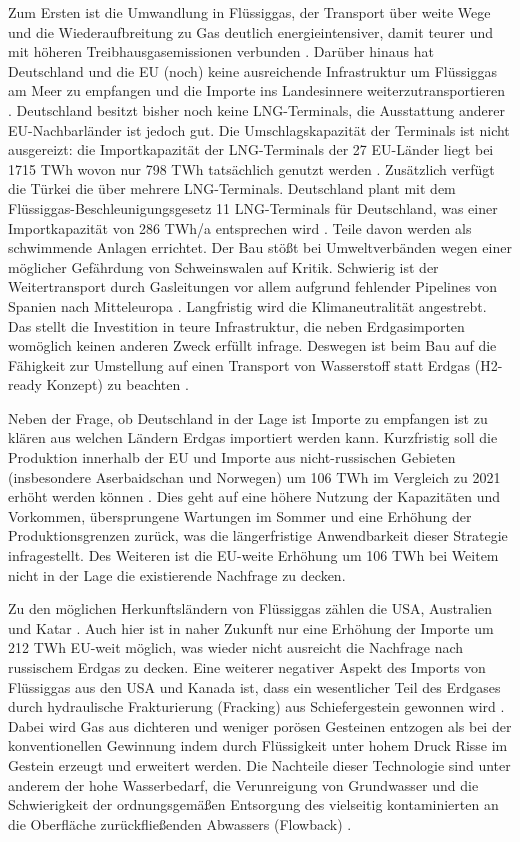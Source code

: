 Zum Ersten ist die Umwandlung in Flüssiggas, der Transport über weite Wege und die Wiederaufbreitung zu Gas deutlich energieintensiver, damit teurer und mit höheren Treibhausgasemissionen verbunden \cite{lng-faq}. 
Darüber hinaus hat Deutschland und die EU (noch) keine ausreichende Infrastruktur um Flüssiggas am Meer zu empfangen und die Importe ins Landesinnere weiterzutransportieren \cite{iwd}. Deutschland besitzt bisher noch keine LNG-Terminals, die Ausstattung anderer EU-Nachbarländer ist jedoch gut. 
Die Umschlagskapazität der Terminals ist nicht ausgereizt: die Importkapazität der LNG-Terminals der 27 EU-Länder liegt bei 1715 TWh wovon nur 798 TWh tatsächlich genutzt werden \cite{leo}. Zusätzlich verfügt die Türkei die über mehrere LNG-Terminals. 
Deutschland plant mit dem Flüssiggas-Beschleunigungsgesetz 11 LNG-Terminals für Deutschland, was einer Importkapazität von 286 TWh/a entsprechen wird \cite{lng-gesetz}. Teile davon werden als schwimmende Anlagen errichtet. Der Bau stößt bei Umweltverbänden wegen einer möglicher Gefährdung von Schweinswalen auf Kritik.
Schwierig ist der Weitertransport durch Gasleitungen vor allem aufgrund fehlender Pipelines von Spanien nach Mitteleuropa \cite{iwd}.
Langfristig wird die Klimaneutralität angestrebt. Das stellt die Investition in teure Infrastruktur, die neben Erdgasimporten womöglich keinen anderen Zweck erfüllt infrage. Deswegen ist beim Bau auf die Fähigkeit zur Umstellung auf einen Transport von Wasserstoff statt Erdgas (H2-ready Konzept) zu beachten \cite{leo}.

Neben der Frage, ob Deutschland in der Lage ist Importe zu empfangen ist zu klären aus welchen Ländern Erdgas importiert werden kann. Kurzfristig soll die Produktion innerhalb der EU und Importe aus nicht-russischen Gebieten (insbesondere Aserbaidschan und Norwegen) um 106 TWh im Vergleich zu 2021 erhöht werden können \cite{iea2022}. Dies geht auf eine höhere Nutzung der Kapazitäten und Vorkommen, übersprungene Wartungen im Sommer und eine Erhöhung der Produktionsgrenzen zurück, was die längerfristige Anwendbarkeit dieser Strategie infragestellt. Des Weiteren ist die EU-weite Erhöhung um 106 TWh bei Weitem nicht in der Lage die existierende Nachfrage zu decken.

Zu den möglichen Herkunftsländern von Flüssiggas zählen die USA, Australien und Katar \cite{iea2022}. Auch hier ist in naher Zukunft nur eine Erhöhung der Importe um 212 TWh EU-weit möglich, was wieder nicht ausreicht die Nachfrage nach russischem Erdgas zu decken. 
Eine weiterer negativer Aspekt des Imports von Flüssiggas aus den USA und Kanada ist, dass ein wesentlicher Teil des Erdgases durch hydraulische Frakturierung (Fracking) aus Schiefergestein gewonnen wird \cite{statista-schiefergasproduktion, statista-nicht-konventionelle-gase}. Dabei wird Gas aus dichteren und weniger porösen Gesteinen entzogen als bei der konventionellen Gewinnung indem durch Flüssigkeit unter hohem Druck Risse im Gestein erzeugt und erweitert werden. Die Nachteile dieser Technologie sind unter anderem der hohe Wasserbedarf, die Verunreigung von Grundwasser und die Schwierigkeit der ordnungsgemäßen Entsorgung des vielseitig kontaminierten an die Oberfläche zurückfließenden Abwassers (Flowback) \cite{uba-fracking}. 

